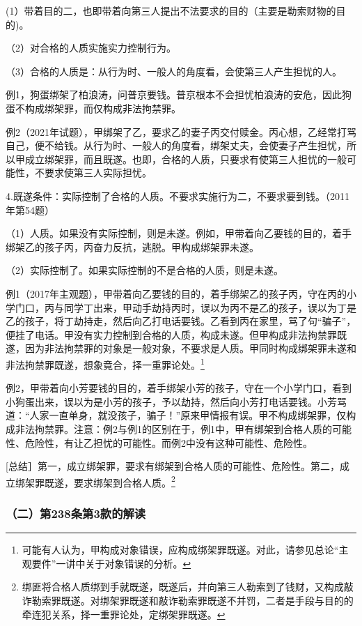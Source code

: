 (1）带着目的二，也即带着向第三人提出不法要求的目的（主要是勒索财物的目的)。

（2）对合格的人质实施实力控制行为。

（3）合格的人质是：从行为时、一般人的角度看，会使第三人产生担忧的人。

例1，狗蛋绑架了柏浪涛，问普京要钱。普京根本不会担忧柏浪涛的安危，因此狗蛋不构成绑架罪，而仅构成非法拘禁罪。

例2（2021年试题），甲绑架了乙，要求乙的妻子丙交付赎金。丙心想，乙经常打骂自己，便不给钱。从行为时、一般人的角度看，绑架丈夫，会使妻子产生担忧，所以甲成立绑架罪，而且既遂。也即，合格的人质，只要求有使第三人担忧的一般可能性，不要求使第三人实际担忧。

4.既遂条件：实际控制了合格的人质。不要求实施行为二，不要求要到钱。（2011年第54题）

（1）人质。如果没有实际控制，则是未遂。例如，甲带着向乙要钱的目的，着手绑架乙的孩子丙，丙奋力反抗，逃脱。甲构成绑架罪未遂。

（2）实际控制了。如果实际控制的不是合格的人质，则是未遂。

例1（2017年主观题），甲带着向乙要钱的目的，着手绑架乙的孩子丙，守在丙的小学门口，丙与同学丁出来，甲动手劫持丙时，误以为丙不是乙的孩子，误以为丁是乙的孩子，将丁劫持走，然后向乙打电话要钱。乙看到丙在家里，骂了句“骗子”，便挂了电话。甲没有实力控制到合格的人质，构成未遂。但甲构成非法拘禁罪既遂，因为非法拘禁罪的对象是一般对象，不要求是人质。甲同时构成绑架罪未遂和非法拘禁罪既遂，想象竟合，择一重罪论处。\footnote{可能有人认为，甲构成对象错误，应构成绑架罪既遂。对此，请参见总论“主观要件”一讲中关于对象错误的分析。}

例2，甲带着向小芳要钱的目的，着手绑架小芳的孩子，守在一个小学门口，看到小狗蛋出来，误以为是小芳的孩子，予以劫持，然后向小芳打电话要钱。小芳骂道：“人家一直单身，就没孩子，骗子！”原来甲情报有误。甲不构成绑架罪，仅构成非法拘禁罪。注意：例2与例1的区别在于，例1中，甲有绑架到合格人质的可能性、危险性，有让乙担忧的可能性。而例2中没有这种可能性、危险性。

[总结］第一，成立绑架罪，要求有绑架到合格人质的可能性、危险性。第二，成立绑架罪既遂，要求绑架到合格人质。\footnote{绑匪将合格人质绑到手就既遂，既遂后，并向第三人勒索到了钱财，又构成敲诈勒索罪既遂。对绑架罪既遂和敲诈勒索罪既遂不并罚，二者是手段与目的的牵连犯关系，择一重罪论处，定绑架罪既遂。}

\subsubsection*{（二）第238条第3款的解读}

